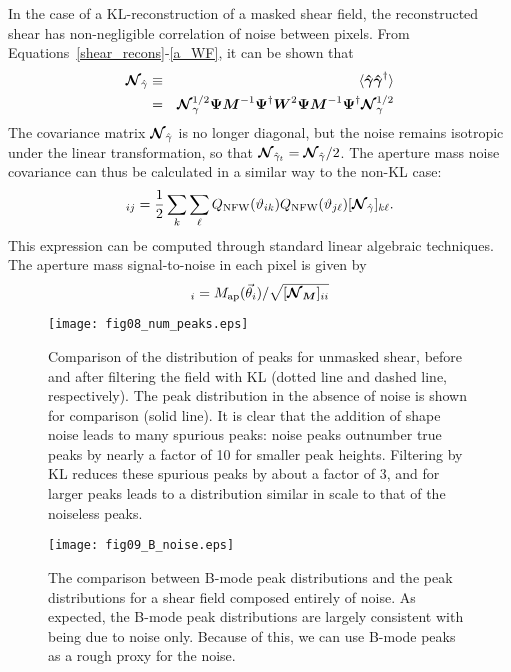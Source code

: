 In the case of a KL-reconstruction of a masked shear field, the reconstructed
shear has non-negligible correlation of noise between pixels.  
From Equations~\ref{shear_recons}-\ref{a_WF}, it can be shown that
\begin{eqnarray}
  \boldsymbol{\mathcal{N}}_{\hat\gamma} 
  & \equiv  &
  \langle\boldsymbol{\hat\gamma} \boldsymbol{\hat\gamma}^\dagger\rangle\nonumber\\
  & = & \boldsymbol{\mathcal{N}}_\gamma^{1/2}\boldsymbol{\Psi} \boldsymbol{M}^{-1} \boldsymbol{\Psi}^\dagger \boldsymbol{W}^2 \boldsymbol{\Psi} \boldsymbol{M}^{-1} \boldsymbol{\Psi}^\dagger \boldsymbol{\mathcal{N}}_\gamma^{1/2}
\end{eqnarray}
The covariance matrix $\boldsymbol{\mathcal{N}}_{\hat\gamma}$ is no longer diagonal, but
the noise remains isotropic under the linear transformation, so that
$\boldsymbol{\mathcal{N}}_{\hat{\gamma}_t} = \boldsymbol{\mathcal{N}}_{\hat{\gamma}}/2$.
The aperture mass noise covariance can thus be calculated in a similar 
way to the non-KL case:
\begin{equation}
  [\Noise_M]_{ij} = \frac{1}{2}\sum_k\sum_\ell Q_{\rm NFW}(\vartheta_{ik})
  Q_{\rm NFW}(\vartheta_{j\ell}) [\Noise_{\hat\gamma}]_{k\ell}.
\end{equation}
This expression can be computed through standard linear algebraic techniques.  
The aperture mass signal-to-noise in each pixel is given by 
\begin{equation}
  [S/N]_i = M_{\rm ap}(\vec\theta_i)/\sqrt{[\mymat{\Noise_M}]_{ii}}
\end{equation}

\begin{figure}
 \centering
 \texttt{[image: fig08\_num\_peaks.eps]}
 \caption{
   Comparison of the distribution of \Map peaks for unmasked shear,
   before and after filtering
   the field with KL (dotted line and dashed line, respectively).  The
   peak distribution in the absence of noise is shown for comparison
   (solid line).  It is clear that the addition of shape noise leads to 
   many spurious \Map peaks: noise peaks outnumber true peaks by nearly a
   factor of 10 for smaller peak heights.  Filtering by KL reduces these
   spurious peaks by about a factor of 3, and for larger peaks leads
   to a distribution similar in scale to that of the noiseless peaks.
   \label{fig_num_peaks}  
 } 
\end{figure}

\begin{figure}
 \centering
 \texttt{[image: fig09\_B\_noise.eps]}
 \caption{The comparison between B-mode peak distributions and the
   peak distributions for a shear field composed entirely of noise.
   As expected, the B-mode peak distributions are largely consistent
   with being due to noise only.  Because of this, we can use B-mode
   peaks as a rough proxy for the noise.
   \label{fig_B_noise} 
 }
\end{figure}

